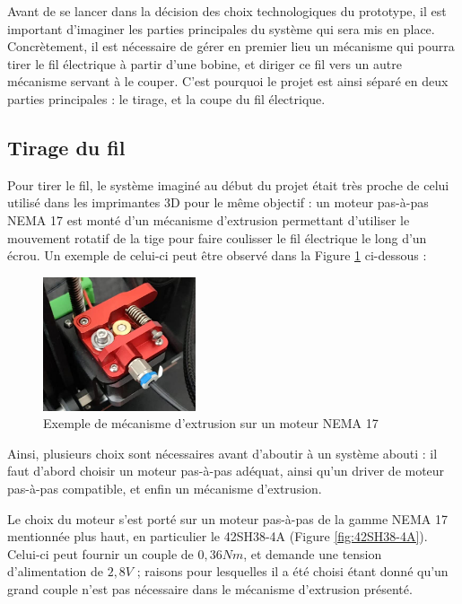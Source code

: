 \par Avant de se lancer dans la décision des choix technologiques du prototype, il est important d'imaginer les parties principales du système qui sera mis en place. Concrètement, il est nécessaire de gérer en premier lieu un mécanisme qui pourra tirer le fil électrique à partir d'une bobine, et diriger ce fil vers un autre mécanisme servant à le couper. C'est pourquoi le projet est ainsi séparé en deux parties principales : le tirage, et la coupe du fil électrique.

\subsection{Tirage du fil}

\par Pour tirer le fil, le système imaginé au début du projet était très proche de celui utilisé dans les imprimantes 3D pour le même objectif : un moteur pas-à-pas NEMA 17 est monté d'un mécanisme d'extrusion permettant d'utiliser le mouvement rotatif de la tige pour faire coulisser le fil électrique le long d'un écrou. Un exemple de celui-ci peut être observé dans la Figure \ref{fig:nema17example} ci-dessous :

\begin{figure}[H]
    \centering
    \includegraphics[width=0.4\textwidth]{images/nema17.png}
    \caption{Exemple de mécanisme d'extrusion sur un moteur NEMA 17}
    \label{fig:nema17example}
\end{figure}

\par Ainsi, plusieurs choix sont nécessaires avant d'aboutir à un système abouti : il faut d'abord choisir un moteur pas-à-pas adéquat, ainsi qu'un driver de moteur pas-à-pas compatible, et enfin un mécanisme d'extrusion.

\par Le choix du moteur s'est porté sur un moteur pas-à-pas de la gamme NEMA 17 mentionnée plus haut, en particulier le 42SH38-4A (Figure \ref{fig:42SH38-4A}). Celui-ci peut fournir un couple de $0,36 Nm$, et demande une tension d'alimentation de $2,8 V$ ; raisons pour lesquelles il a été choisi étant donné qu'un grand couple n'est pas nécessaire dans le mécanisme d'extrusion présenté.

